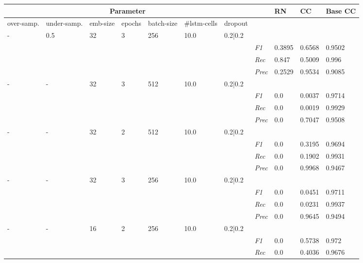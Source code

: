     \begin{table}[]
    \tiny
    \tabcolsep=0.11cm
    \begin{tabularx}{\textwidth}{XXXXXXX|X|X|X|X}
    \toprule
    \multicolumn{7}{c}{Parameter} & & RN & CC & Base CC \\ \midrule
    over-\newline samp. & under-\newline samp. & emb-\newline size & epochs &batch-\newline size & \#lstm-\newline cells & dropout & & & & \\ \midrule
    - & 0.5 & 32 & 3 & 256 &10.0 & 0.2|0.2 & & & & \\
    & & & & & & & \textit{F1} & 0.3895 & 0.6568 & 0.9502       \\
    & & & & & & & \textit{Rec} &  0.847 & 0.5009  & 0.996  \\
    & & & & & & & \textit{Prec} & 0.2529 & 0.9534 & 0.9085 \\ \midrule
    - & - & 32 & 3 & 512 &10.0 & 0.2|0.2 & & & & \\
    & & & & & & & \textit{F1} & 0.0 & 0.0037 & 0.9714       \\
    & & & & & & & \textit{Rec} &  0.0 & 0.0019  & 0.9929  \\
    & & & & & & & \textit{Prec} & 0.0 & 0.7047 & 0.9508 \\ \midrule
    - & - & 32 & 2 & 512 &10.0 & 0.2|0.2 & & & & \\
    & & & & & & & \textit{F1} & 0.0 & 0.3195 & 0.9694       \\
    & & & & & & & \textit{Rec} &  0.0 & 0.1902  & 0.9931  \\
    & & & & & & & \textit{Prec} & 0.0 & 0.9968 & 0.9467 \\ \midrule
    - & - & 32 & 3 & 256 &10.0 & 0.2|0.2 & & & & \\
    & & & & & & & \textit{F1} & 0.0 & 0.0451 & 0.9711       \\
    & & & & & & & \textit{Rec} &  0.0 & 0.0231  & 0.9937  \\
    & & & & & & & \textit{Prec} & 0.0 & 0.9645 & 0.9494 \\ \midrule
    - & - & 16 & 2 & 256 &10.0 & 0.2|0.2 & & & & \\
    & & & & & & & \textit{F1} & 0.0 & 0.5738 & 0.972       \\
    & & & & & & & \textit{Rec} &  0.0 & 0.4036  & 0.9676  \\

\end{tabularx}
\end{table}
